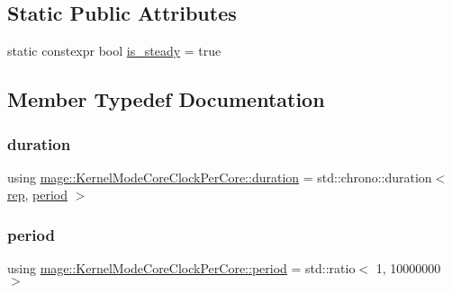 \subsection*{Static Public Attributes}
\begin{DoxyCompactItemize}
\item 
static constexpr bool \mbox{\hyperlink{structmage_1_1_kernel_mode_core_clock_per_core_a8b87465ab1497015a4f6436fd4637645}{is\+\_\+steady}} = true
\end{DoxyCompactItemize}


\subsection{Member Typedef Documentation}
\mbox{\label{structmage_1_1_kernel_mode_core_clock_per_core_ae159e34904ac66f359f0152291e8e6dc}} 
\subsubsection{\texorpdfstring{duration}{duration}}
{\footnotesize\ttfamily using \mbox{\hyperlink{structmage_1_1_kernel_mode_core_clock_per_core_ae159e34904ac66f359f0152291e8e6dc}{mage\+::\+Kernel\+Mode\+Core\+Clock\+Per\+Core\+::duration}} =  std\+::chrono\+::duration$<$ \mbox{\hyperlink{structmage_1_1_kernel_mode_core_clock_per_core_a436d770fc6a86e736dda04d72402eb46}{rep}}, \mbox{\hyperlink{structmage_1_1_kernel_mode_core_clock_per_core_a8baf818e6d058755e971344b5c8ff659}{period}} $>$}

\mbox{\label{structmage_1_1_kernel_mode_core_clock_per_core_a8baf818e6d058755e971344b5c8ff659}} 
\subsubsection{\texorpdfstring{period}{period}}
{\footnotesize\ttfamily using \mbox{\hyperlink{structmage_1_1_kernel_mode_core_clock_per_core_a8baf818e6d058755e971344b5c8ff659}{mage\+::\+Kernel\+Mode\+Core\+Clock\+Per\+Core\+::period}} =  std\+::ratio$<$ 1, 10\textquotesingle{}000\textquotesingle{}000 $>$}

